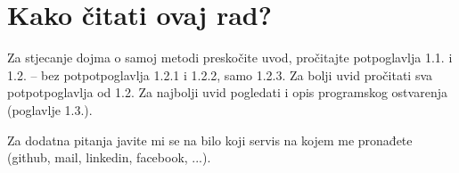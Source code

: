 \documentclass[times, utf8, numeric]{fer}
\begin{document}
\lstset{
    language=C,
    tabsize=2, 
    basicstyle=\scriptsize,
    showstringspaces=false,
    frame = single,
    aboveskip=2em,
    belowskip=2em,
    numbers=left,
    xleftmargin=2em,
    breaklines=true,
    captionpos=b
}
\renewcommand{\lstlistingname}{Programski kod}

\def\inlinecode{\lstinline[basicstyle=\footnotesize]}

\setcounter{chapter}{-1}
\chapter{Kako čitati ovaj rad?}

Za stjecanje dojma o samoj metodi preskočite uvod, pročitajte potpoglavlja 1.1. i 1.2. -- bez potpotpoglavlja 1.2.1 i 1.2.2, samo 1.2.3. Za bolji uvid pročitati sva potpotpoglavlja od 1.2. Za najbolji uvid pogledati i opis programskog ostvarenja (poglavlje 1.3.). 

Za dodatna pitanja javite mi se na bilo koji servis na kojem me pronađete (github, mail, linkedin, facebook, ...). 






\end{document}
